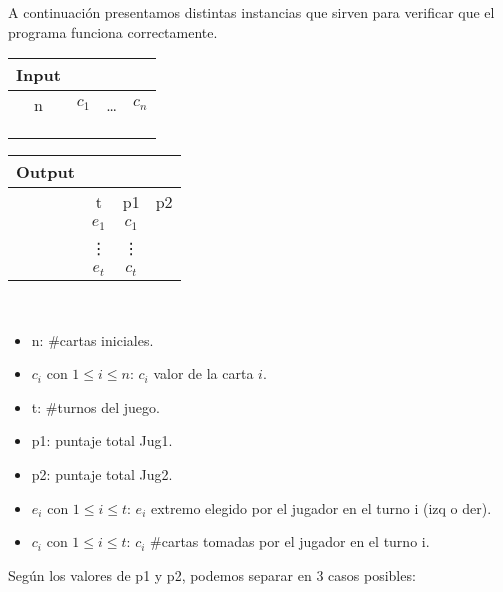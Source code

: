 \documentclass[11pt, a4paper, twoside]{article}
\begin{document}
{}

A continuación presentamos distintas instancias que sirven para verificar que el programa funciona correctamente.\\

\begin{minipage}{0.4\textwidth}
      \begin{tabular}{cccc}
         Input \\
         \hline
         n & $c_1$ & \dots & $c_n$ \\
         \\
         \\
         \\
      \end{tabular}
\end{minipage} 
\begin{minipage}{0.3\textwidth}
      \begin{tabular}{cccc}
        Output\\
        \hline
        & t   & p1  & p2 \\
        & $e_1$ & $c_1$  & \\
        & \vdots & \vdots & \\
        & $e_t$  & $c_t$ & 
      \end{tabular}
\end{minipage} \\

\begin{itemize}
  \item n: \#cartas iniciales. 
  \item $c_i$ con $1 \le i \le n$: $c_i$ valor de la carta $i$. 
  \item t: \#turnos del juego. 
  \item p1: puntaje total Jug1.
  \item p2: puntaje total Jug2.
  \item $e_i$ con $1 \le i \le t$: $e_i$ extremo elegido por el jugador en el turno i (izq o der). 
  \item $c_i$ con $1 \le i \le t$: $c_i$ \#cartas tomadas por el jugador en el turno i.   
\end{itemize}
        
Según los valores de p1 y p2, podemos separar en 3 casos posibles: 
        
\end{document}
